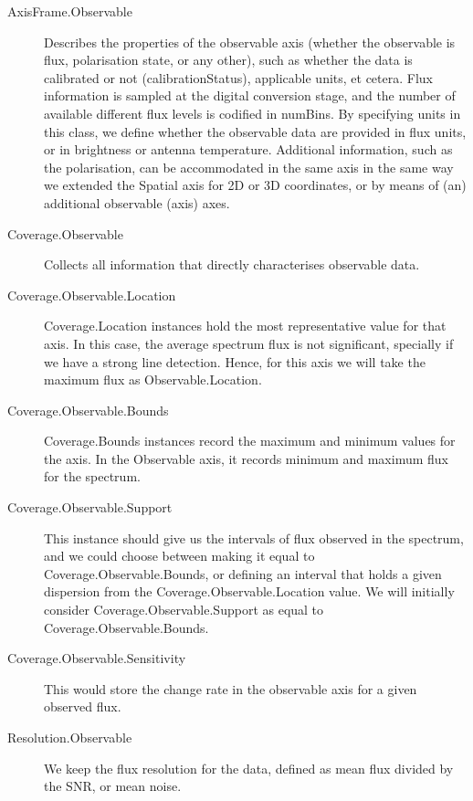 			\begin{description}
				\item[AxisFrame.Observable] Describes the 
				properties of the observable axis (whether the
				observable is flux,
				polarisation state, or any other), such as whether
				the data is calibrated or not (calibrationStatus),
				applicable units, et cetera. Flux information is
				sampled at the digital conversion stage, and the
				number of available different flux levels is
				codified in numBins. By specifying units in this
				class, we define whether the observable data are
				provided in flux units, or in brightness or antenna
				temperature. Additional information, such as the
				polarisation, can be accommodated in the same axis
				in the same way we extended the Spatial axis for 2D
				or 3D coordinates, or by means of (an) additional
				observable (axis) axes.
				
				 \item[Coverage.Observable] Collects all
				information that directly characterises observable
				data.
				
				 \item[Coverage.Observable.Location]
				Coverage.Location instances hold the most
				representative value for that axis. In this case,
				the average spectrum flux is not significant,
				specially if we have a strong line detection.
				Hence, for this axis we will take the maximum flux
				as Observable.Location.
				
				 \item[Coverage.Observable.Bounds] Coverage.Bounds
				instances record the maximum and minimum values for
				the axis. In the Observable axis, it records
				minimum and maximum flux for the spectrum.
				
				 \item[Coverage.Observable.Support] This instance
				should give us the intervals of flux observed in
				the spectrum, and we could choose between making it
				equal to Coverage.Observable.Bounds, or defining an
				interval that holds a given dispersion from the
				Coverage.Observable.Location value. We will
				initially consider Coverage.Observable.Support as
				equal to Coverage.Observable.Bounds.
				
				 \item[Coverage.Observable.Sensitivity] This would
				store the change rate in the observable axis for a
				given observed flux.
				
				 \item[Resolution.Observable] We keep the flux
				resolution for the data, defined as mean flux
				divided by the SNR, or mean noise.
				

\end{description}
